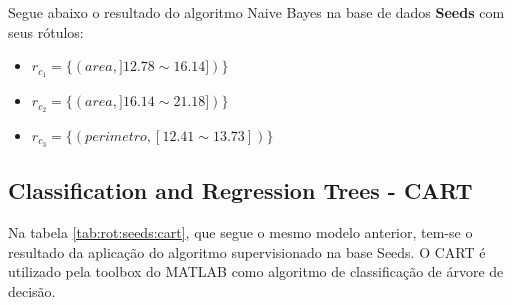 %  





Segue abaixo o resultado do algoritmo Naive Bayes na base de dados \textbf{Seeds} com seus rótulos: 
\begin{itemize}[noitemsep]
 \item ${r_{c_1}=\{ (area, ]12.78 \sim 16.14]) \} }$  
 \item ${r_{c_2}=\{ (area, ]16.14 \sim 21.18]) \} }$
 \item ${r_{c_3}=\{ (perimetro, [12.41 \sim 13.73])\} }$
\end{itemize}


\subsection{Classification and Regression Trees - CART}\label{cap:resultados:ssec:seed:cart}

Na tabela \ref{tab:rot:seeds:cart}, que segue o mesmo modelo anterior, tem-se o resultado da aplicação do algoritmo supervisionado na base Seeds. O CART é utilizado pela toolbox do MATLAB como algoritmo de classificação de árvore de decisão. 

